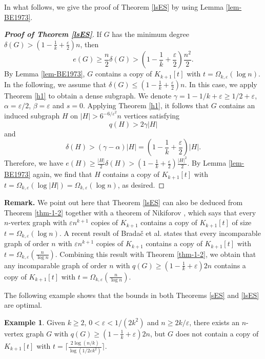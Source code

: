 \documentclass[11pt,a4paper]{article}
\theoremstyle{plain}
\theoremstyle{definition}
\newtheorem{example}{Example}[section]
\begin{document}
In what follows, we give the proof of Theorem \ref{lsES} by using Lemma \ref{lem-BE1973}. 


\begin{proof}[{\bf Proof of Theorem \ref{lsES}}] 
If $G$ has the minimum degree $\delta(G)> (1-\frac{1}{k}+\frac{\varepsilon}{2} )n$,
then 
\[ e(G)\geq \frac{n}{2}\delta(G)> 
\left(1-\frac{1}{k}+\frac{\varepsilon}{2} \right) \frac{n^2}{2}. \]  
By Lemma \ref{lem-BE1973}, 
$G$ contains a copy of $K_{k+1}[t]$ with $t=\Omega_{k,\varepsilon} (\log n)$. 
In the following, we assume that $\delta(G)\leq (1 - \frac{1}{k} + \frac{\varepsilon}{2})n$.  In this case, we apply 
Theorem \ref{h1} to obtain a dense subgraph. 
We denote $\gamma=1-1/k + \varepsilon \geq 1/2+ \varepsilon$, 
$\alpha= \varepsilon /2$, $\beta= \varepsilon $ and $s=0$. Applying Theorem \ref{h1}, it follows that $G$ contains an induced subgraph $H$ on $|H|>6^{-6/\varepsilon^{2}} n$ vertices satisfying
\[  q(H)>2\gamma |H| \] 
and 
\[  \delta(H)>(\gamma-\alpha)|H|= 
\left(1-\frac{1}{k}+\frac{\varepsilon}{2} \right)|H|. \]  
Therefore, we have $e(H) \geq \frac{|H|}{2}\delta(H)> (1-\frac{1}{k}+\frac{\varepsilon}{2} )\frac{|H|^{2}}{2}$. 
By Lemma \ref{lem-BE1973} again, we find that $H$ contains a copy of $K_{k+1}[t]$ with $t=\Omega_{k,\varepsilon}(\log |H|) = \Omega_{k,\varepsilon} (\log n)$, as desired.  
\end{proof}

\noindent 
{\bf Remark.}
We point out here that Theorem \ref{lsES} can also be deduced from Theorem \ref{thm-1-2} together with a theorem of Nikiforov \cite{Niki2008blms}, which says that every $n$-vertex graph with $\varepsilon n^{k+1}$ copies of $K_{k+1}$ contains a copy of $K_{k+1}[t]$ of size $t=\Omega_{k,\varepsilon}(\log n)$. 
A recent result of Brada\v{c} et al. \cite{BLWX2024} states that every incomparable graph of order $n$ with $\varepsilon n^{k+1}$ copies of $K_{k+1}$ contains a copy of $K_{k+1}[t]$ with $t=\Omega_{k,\varepsilon}(\frac{n}{\log n})$. Combining this result with Theorem \ref{thm-1-2},  
we obtain that any incomparable graph of order $n$ with $q(G)\ge (1- \frac{1}{k} + \varepsilon)2n$ contains a copy of $K_{k+1}[t]$ with $t=\Omega_{k,\varepsilon}(\frac{n}{\log n})$. 



\medskip 
The following example shows that the bounds 
in both Theorems \ref{sES} and \ref{lsES} are optimal. 

\begin{example}
    \label{exam-2-4}
    Given $k\ge 2$, $0< \varepsilon < 1/(2k^2) $ and $n\ge 2k/\varepsilon$,  
there exists an $n$-vertex graph $G$ with 
$q(G)\ge (1- \frac{1}{k} + \varepsilon)2n$, 
but $G$ does not contain a copy of $K_{k+1}[t]$ 
with $t=\big\lceil\frac{2\log (n/k)}{\log (1/2\varepsilon k^2)}\big\rceil$.  
\end{example} 
\end{document}
